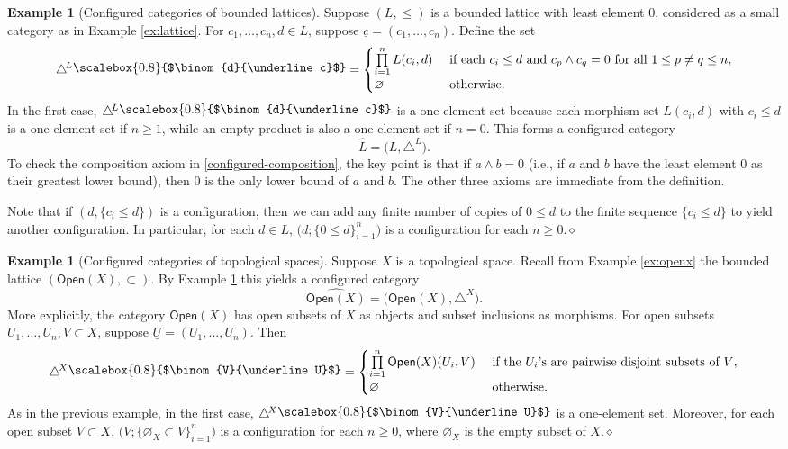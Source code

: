\documentclass[11pt]{amsbook}
\numberwithin{section}{chapter}
\numberwithin{subsection}{section}
\numberwithin{equation}{section}
\theoremstyle{plain}
\theoremstyle{definition}
\newtheorem{example}[equation]{Example}
\newcommand{\dqed}{\hfill$\diamond$}
\newcommand{\Config}{\triangle} %
\newcommand{\Configl}{\Config^{\! L}}
\newcommand{\Configx}{\Config^{\! X}}
\newcommand{\Lhat}{\widehat{L}}
\renewcommand{\emptyset}{\varnothing}
\newcommand{\Open}{\mathsf{Open}}
\newcommand{\Openx}{\Open(X)}
\newcommand{\Openxhat}{\widehat{\Openx}}
\newcommand{\uc}{\underline c}
\newcommand{\uU}{\underline U}
\newcommand{\smallprof}[1]
{\raisebox{.05cm}{\scalebox{0.8}{#1}}}
\newcommand{\duc}{\smallprof{$\binom{d}{\uc}$}}
\newcommand{\VuU}{\smallprof{$\binom{V}{\uU}$}}
\begin{document}
\begin{example}[Configured categories of bounded lattices]\label{ex:boundedlatter-config}
Suppose $(L,\leq)$ is a bounded lattice with least element $0$, considered as a small category as in Example \ref{ex:lattice}.  For $c_1,\ldots,c_n,d \in L$, suppose $\uc=(c_1,\ldots,c_n)$.  Define the set
\[\Configl\duc= \begin{cases} \prod\limits_{i=1}^n L(c_i,d) & \text{ if each $c_i \leq d$ and $c_p \wedge c_q=0$ for all $1 \leq p\not=q \leq n$},\\ \varnothing & \text{ otherwise}.\end{cases}\]
In the first case, $\Configl\duc$ is a one-element set because each morphism set $L(c_i,d)$ with $c_i \leq d$ is a one-element set if $n \geq 1$, while an empty product is also a one-element set if $n=0$. This forms a configured category\label{notation:lhat} \[\Lhat =\bigl(L,\Configl\bigr).\]  To check the composition axiom in \eqref{configured-composition}, the key point is that if $a \wedge b = 0$ (i.e., if $a$ and $b$ have the least element $0$ as their greatest lower bound), then $0$ is the only lower bound of $a$ and $b$.  The other three axioms are immediate from the definition.  

Note that if $(d,\{c_i \leq d\})$ is a configuration, then we can add any finite number of copies of $0 \leq d$ to the finite sequence $\{c_i \leq d\}$ to yield another configuration.  In particular, for each $d \in L$, $\bigl(d;\{0\leq d\}_{i=1}^n\bigr)$ is a configuration for each $n \geq 0$.\dqed
\end{example}

\begin{example}[Configured categories of topological spaces]\label{ex:open-configuration}
Suppose $X$ is a topological space.  Recall from Example \ref{ex:openx} the bounded lattice $(\Openx,\subset)$.  By Example \ref{ex:boundedlatter-config} this yields a configured category \[\Openxhat =\bigl(\Openx,\Configx\bigr).\] More explicitly, the category $\Openx$ has open subsets of $X$ as objects and subset inclusions as morphisms.  For open subsets $U_1,\ldots,U_n,V \subset X$, suppose $\uU = (U_1,\ldots,U_n)$. Then \[\Configx\VuU = \begin{cases} \prod\limits_{i=1}^n\Openx(U_i,V) & \text{ if the $U_i$'s are pairwise disjoint subsets of $V$},\\ \varnothing & \text{ otherwise}.\end{cases}\]
As in the previous example, in the first case, $\Configx\VuU$ is a one-element set.  Moreover, for each open subset $V \subset X$, $\bigl(V;\{\emptyset_X \subset V\}_{i=1}^n\bigr)$ is a configuration for each $n \geq 0$, where $\emptyset_X$ is the empty subset of $X$.\dqed
\end{example}
\end{document}
